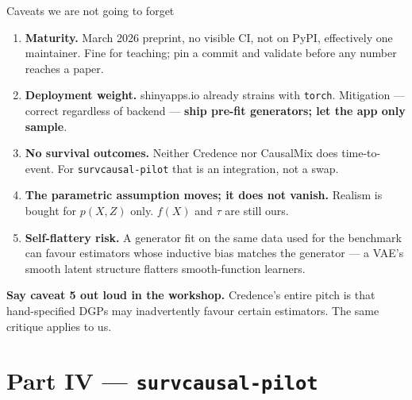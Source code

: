 \documentclass[aspectratio=169]{beamer}
\begin{document}
\begin{frame}{Caveats we are not going to forget}
  \small
  \begin{enumerate}
    \item \textbf{Maturity.} March 2026 preprint, no visible CI, not on PyPI,
          effectively one maintainer. Fine for teaching; pin a commit and validate
          before any number reaches a paper.
    \item \textbf{Deployment weight.} shinyapps.io already strains with \texttt{torch}.
          Mitigation --- correct regardless of backend --- \textbf{ship pre-fit
          generators; let the app only sample}.
    \item \textbf{No survival outcomes.} Neither Credence nor CausalMix does
          time-to-event. For \texttt{survcausal-pilot} that is an integration, not a swap.
    \item \textbf{The parametric assumption moves; it does not vanish.} Realism is
          bought for $p(X, Z)$ only. $f(X)$ and $\tau$ are still ours.
    \item \textbf{Self-flattery risk.} A generator fit on the same data used for the
          benchmark can favour estimators whose inductive bias matches the generator ---
          a VAE's smooth latent structure flatters smooth-function learners.
  \end{enumerate}

  \vspace{0.3em}
  \textcolor{accent}{\textbf{Say caveat 5 out loud in the workshop.}} Credence's entire
  pitch is that hand-specified DGPs may inadvertently favour certain estimators. The
  same critique applies to us.
\end{frame}

\section{Part IV --- \texttt{survcausal-pilot}}
\end{document}
